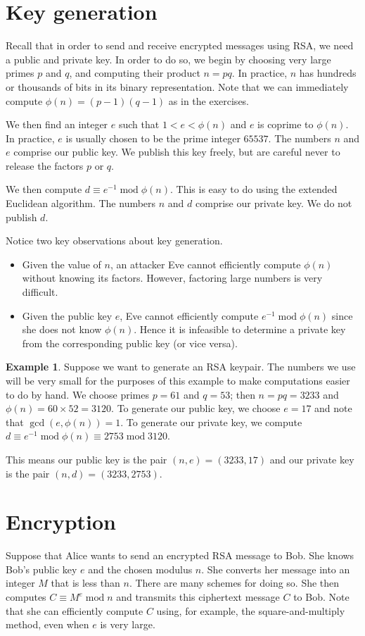 \documentclass{book}
\theoremstyle{plain}
\theoremstyle{definition}
\newtheorem{example}[theorem]{Example}
\renewcommand{\mod}{\operatorname{mod}}
\renewcommand{\mod}{\operatorname{mod}}
\begin{document}
\section{Key generation}
Recall that in order to send and receive encrypted messages using RSA, we need a public and private key. In order to do so, we begin by choosing very large primes $p$ and $q$, and computing their product $n = pq$. In practice, $n$ has hundreds or thousands of bits in its binary representation. Note that we can immediately compute $\phi(n) = (p-1)(q-1)$ as in the exercises.

We then find an integer $e$ such that $1 < e < \phi(n)$ and $e$ is coprime to $\phi(n)$. In practice, $e$ is usually chosen to be the prime integer $65537$. The numbers $n$ and $e$ comprise our public key. We publish this key freely, but are careful never to release the factors $p$ or $q$.

We then compute $d \equiv e^{-1} \mod \phi(n)$. This is easy to do using the extended Euclidean algorithm. The numbers $n$ and $d$ comprise our private key. We do not publish $d$.

Notice two key observations about key generation.
\begin{itemize}
\item Given the value of $n$, an attacker Eve cannot efficiently compute $\phi(n)$ without knowing its factors. However, factoring large numbers is very difficult.
\item Given the public key $e$, Eve cannot efficiently compute $e^{-1} \mod \phi(n)$ since she does not know $\phi(n)$. Hence it is infeasible to determine a private key from the corresponding public key (or vice versa).
\end{itemize}

\begin{example}
Suppose we want to generate an RSA keypair. The numbers we use will be very small for the purposes of this example to make computations easier to do by hand. We choose primes $p = 61$ and $q = 53$; then $n = pq = 3233$ and $\phi(n) = 60 \times 52 = 3120$. To generate our public key, we choose $e = 17$ and note that $\gcd(e,\phi(n)) = 1$. To generate our private key, we compute $d \equiv e^{-1} \mod \phi(n) \equiv 2753 \mod 3120$.

This means our public key is the pair $(n,e) = (3233,17)$ and our private key is the pair $(n,d) = (3233,2753)$.
\end{example}

\section{Encryption}
Suppose that Alice wants to send an encrypted RSA message to Bob. She knows Bob's public key $e$ and the chosen modulus $n$. She converts her message into an integer $M$ that is less than $n$. There are many schemes for doing so. She then computes $C \equiv M^e \mod n$ and transmits this ciphertext message $C$ to Bob. Note that she can efficiently compute $C$ using, for example, the square-and-multiply method, even when $e$ is very large.
\end{document}
